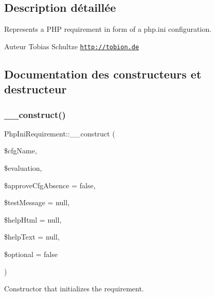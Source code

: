 \subsection{Description détaillée}
Represents a P\+HP requirement in form of a php.\+ini configuration.

\begin{DoxyAuthor}{Auteur}
Tobias Schultze \href{http://tobion.de}{\tt http\+://tobion.\+de} 
\end{DoxyAuthor}


\subsection{Documentation des constructeurs et destructeur}
\mbox{\label{classPhpIniRequirement_af3e88e1bbec416c36ed54c88ca1397bb}} 
\subsubsection{\texorpdfstring{\+\_\+\+\_\+construct()}{\_\_construct()}}
{\footnotesize\ttfamily Php\+Ini\+Requirement\+::\+\_\+\+\_\+construct (\begin{DoxyParamCaption}\item[{}]{\$cfg\+Name,  }\item[{}]{\$evaluation,  }\item[{}]{\$approve\+Cfg\+Absence = {\ttfamily false},  }\item[{}]{\$test\+Message = {\ttfamily null},  }\item[{}]{\$help\+Html = {\ttfamily null},  }\item[{}]{\$help\+Text = {\ttfamily null},  }\item[{}]{\$optional = {\ttfamily false} }\end{DoxyParamCaption})}

Constructor that initializes the requirement.


